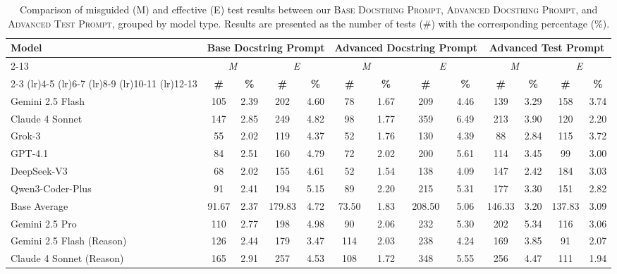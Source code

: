\documentclass[acmsmall]{acmart}
\begin{document}
\begin{table}[htbp!]
\centering
\tiny
\caption{Comparison of misguided (M) and effective (E) test results between our \textsc{Base Docstring Prompt}, \textsc{Advanced Docstring Prompt}, and \textsc{Advanced Test Prompt}, grouped by model type. Results are presented as the number of tests (\#) with the corresponding percentage (\%).}
\label{tab:advanced_docstring}
\begin{tabular}{l|cc|cc|cc|cc|cc|cc}
\toprule
\multirow{4}{*}{\textbf{Model}} & \multicolumn{4}{c|}{\textbf{Base Docstring Prompt}} & \multicolumn{4}{c|}{\textbf{Advanced Docstring Prompt}} & \multicolumn{4}{c}{\textbf{Advanced Test Prompt}} \\
\cmidrule{2-13}
& \multicolumn{2}{c|}{\emph{M}} & \multicolumn{2}{c|}{\emph{E}} & \multicolumn{2}{c|}{\emph{M}} & \multicolumn{2}{c|}{\emph{E}} & \multicolumn{2}{c|}{\emph{M}} & \multicolumn{2}{c}{\emph{E}} \\
\cmidrule(lr){2-3} \cmidrule(lr){4-5} \cmidrule(lr){6-7} \cmidrule(lr){8-9} \cmidrule(lr){10-11} \cmidrule(lr){12-13}
& \textbf{\#} & \textbf{\%} & \textbf{\#} & \textbf{\%} & \textbf{\#} & \textbf{\%} & \textbf{\#} & \textbf{\%} & \textbf{\#} & \textbf{\%} & \textbf{\#} & \textbf{\%} \\
\midrule
Gemini 2.5 Flash & 105 & 2.39 & 202 & 4.60 & 78 & 1.67 & 209 & 4.46 & 139 & 3.29 & 158 & 3.74 \\
Claude 4 Sonnet & 147 & 2.85 & 249 & 4.82 & 98 & 1.77 & 359 & 6.49 & 213 & 3.90 & 120 & 2.20 \\
Grok-3 & 55 & 2.02 & 119 & 4.37 & 52 & 1.76 & 130 & 4.39 & 88 & 2.84 & 115 & 3.72 \\
GPT-4.1 & 84 & 2.51 & 160 & 4.79 & 72 & 2.02 & 200 & 5.61 & 114 & 3.45 & 99 & 3.00 \\
DeepSeek-V3 & 68 & 2.02 & 155 & 4.61 & 52 & 1.54 & 138 & 4.09 & 147 & 2.42 & 184 & 3.03 \\
Qwen3-Coder-Plus & 91 & 2.41 & 194 & 5.15 & 89 & 2.20 & 215 & 5.31 & 177 & 3.30 & 151 & 2.82 \\
\midrule
Base Average & 91.67 & 2.37 & 179.83 & 4.72 & 73.50 & 1.83 & 208.50 & 5.06 & 146.33 & 3.20 & 137.83 & 3.09 \\
\midrule
\midrule
Gemini 2.5 Pro & 110 & 2.77 & 198 & 4.98 & 90 & 2.06 & 232 & 5.30 & 202 & 5.34 & 116 & 3.06 \\
Gemini 2.5 Flash (Reason) & 126 & 2.44 & 179 & 3.47 & 114 & 2.03 & 238 & 4.24 & 169 & 3.85 & 91 & 2.07 \\
Claude 4 Sonnet (Reason) & 165 & 2.91 & 257 & 4.53 & 108 & 1.72 & 348 & 5.55 & 256 & 4.47 & 111 & 1.94 \\

\end{tabular}
\end{table}
\end{document}
